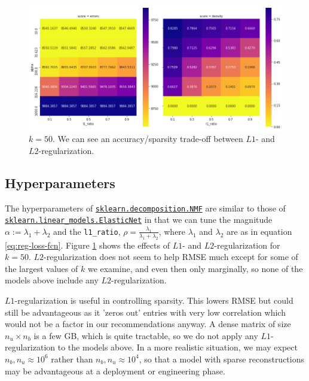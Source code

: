 \documentclass[11pt]{article}
\begin{document}
\begin{figure}[t]
    \includegraphics[width=\linewidth]{../image/goodreads-l1-and-l2-regularization/output_18_0.png}
    \caption[$L1$- and $L2$-regularization]{$k=50$. We can see an accuracy/sparsity trade-off between $L1$- and $L2$-regularization.}
     \label{fig:regularization}
\end{figure}




    \hypertarget{hyperparameters}{%
\subsection{Hyperparameters}\label{hyperparameters}}



The hyperparameters of \href{}{\texttt{sklearn.decomposition.NMF}} are similar to those of 
\href{https://scikit-learn.org/stable/modules/generated/sklearn.linear_model.ElasticNet.html#sklearn.linear_model.ElasticNet}{\texttt{sklearn.linear\_models.ElasticNet}}
in that we can tune the magnitude $\alpha := \lambda_1 + \lambda_2$ and the \texttt{l1\_ratio}, $\rho = \frac{\lambda_1}{\lambda_1 + \lambda_2}$,
where $\lambda_1$ and $\lambda_2$ are as in equation \eqref{eq:reg-loss-fcn}.
Figure \ref{fig:regularization} shows the effects of $L1$- and $L2$-regularization for $k=50$.
$L2$-regularization does not seem to help RMSE much except for some of the largest values of $k$ we examine, and even then only marginally,
so none of the models above include any $L2$-regularization.

$L1$-regularization is useful in controlling sparsity.
This lowers RMSE but could still be advantageous as it 'zeros out' entries with very low correlation which would not be a factor in our recommendations anyway.
A dense matrix of size $n_u \times n_b$ is a few GB, which is quite tractable, so we do not apply any $L1$-regularization to the models above.
In a more realistic situation, we may expect $n_b, n_u \approx 10^6$ rather than $n_b, n_u \approx 10^4$,
so that a model with sparse reconstructions may be advantageous at a deployment or engineering phase.
\end{document}
